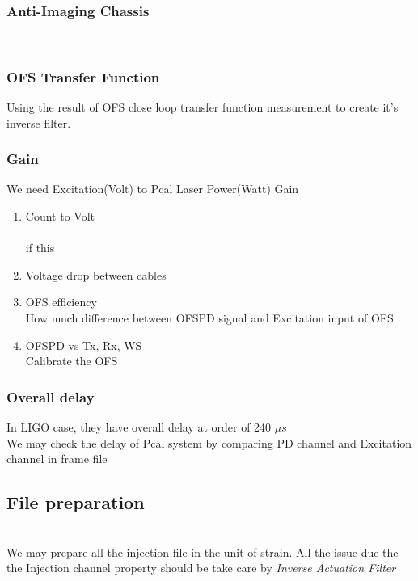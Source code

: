     \subsubsection{Anti-Imaging Chassis}
     \\
    
    \subsubsection{OFS Transfer Function}
    Using the result of OFS close loop transfer function measurement to create it's inverse filter. 
    \subsubsection{Gain}
    We need Excitation(Volt) to Pcal Laser Power(Watt) Gain
    \begin{enumerate}
        \item Count to Volt \\
            \\
            if this 
        \item Voltage drop between cables \\
        \item OFS efficiency \\
            How much difference between OFSPD signal and Excitation input of OFS
        \item OFSPD vs Tx, Rx, WS \\
	    Calibrate the OFS
    \end{enumerate}
    
    \subsubsection{Overall delay}
In LIGO case, they have overall delay at order of 240 $\mu s$ \cite{ligo:inj}\\
We may check the delay of Pcal system by comparing PD channel and Excitation channel in frame file


\subsection{File preparation}
\\
We may prepare all the injection file in the unit of strain. All the issue due the the Injection channel property should be take care by \emph{Inverse Actuation Filter}
